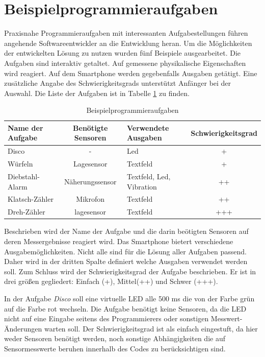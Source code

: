 \documentclass[11pt,a4paper]{report}
\begin{document}
\section{Beispielprogrammieraufgaben}\label{sec:activities}
Praxisnahe Programmieraufgaben mit interessanten Aufgabestellungen führen angehende Softwareentwickler an die Entwicklung heran.
Um die Möglichkeiten der entwickelten Lösung zu nutzen wurden fünf Beispiele ausgearbeitet.
Die Aufgaben sind interaktiv getaltet.
Auf gemessene physikalische Eigenschaften wird reagiert.
Auf dem Smartphone werden gegebenfalls Ausgaben getätigt.
Eine zusätzliche Angabe des Schwierigkeitsgrads unterstützt Anfänger bei der Auswahl.
Die Liste der Aufgaben ist in Tabelle \ref{tab:excercises} zu finden.
\begin{table}[htbp]
  \centering
  \begin{tabular}{|l|c|p{2cm}|c|}
      \hline
      \textbf{Name der Aufgabe} & \textbf{Benötigte Sensoren} & \textbf{Verwendete Ausgaben} & \textbf{Schwierigkeitsgrad} \\
      \hline
      Disco & - & Led & + \\
      \hline
      Würfeln & Lagesensor & Textfeld &+ \\
      \hline
      Diebstahl-Alarm & Näherungssensor & Textfeld, Led, Vibration & ++ \\
      \hline
      Klatsch-Zähler & Mikrofon & Textfeld & ++ \\
      \hline
      Dreh-Zähler & lagesensor & Textfeld & +++ \\
      \hline
  \end{tabular}
  \caption{Beispielprogrammieraufgaben}
  \label{tab:excercises}
\end{table}

Beschrieben wird der Name der Aufgabe und die darin beötigten Sensoren auf deren Messergebnisse reagiert wird.
Das Smartphone bietert verschiedene Ausgabemöglichkeiten.
Nicht alle sind für die Lösung aller Aufgaben passend.
Daher wird in der dritten Spalte definiert welche Ausgaben verwendet werden soll.
Zum Schluss wird der Schwierigkeitsgrad der Aufgabe beschrieben.
Er ist in drei größen gegliedert:
Einfach (+), Mittel(++) und Schwer (+++).

In der Aufgabe \textit{Disco} soll eine virtuelle LED alle 500 ms die von der Farbe grün auf die Farbe rot wechseln.
Die Aufgabe benötigt keine Sensoren, da die LED nicht auf eine Eingabe seitens des Programmierers oder sonstigen Messwert-Änderungen warten soll.
Der Schwierigkeitsgrad ist als einfach eingestuft, da hier weder Sensoren benötigt werden, noch sonstige Abhängigkeiten die auf Sensormesswerte beruhen innerhalb des Codes zu berücksichtigen sind.
\end{document}
